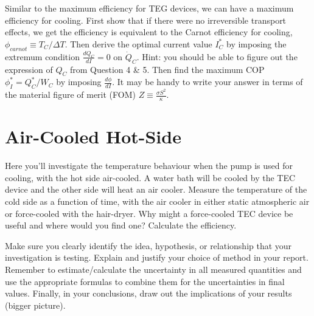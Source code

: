\documentclass[
  letterpaper,
  DIV=11,
  numbers=noendperiod]{scrreprt}
\begin{document}
\begin{tcolorbox}[enhanced jigsaw, toprule=.15mm, coltitle=black, bottomrule=.15mm, colbacktitle=quarto-callout-tip-color!10!white, opacitybacktitle=0.6, titlerule=0mm, colframe=quarto-callout-tip-color-frame, title=\textcolor{quarto-callout-tip-color}{\faLightbulb}\hspace{0.5em}{Question 8 (Advanced)}, leftrule=.75mm, bottomtitle=1mm, breakable, opacityback=0, arc=.35mm, left=2mm, colback=white, rightrule=.15mm, toptitle=1mm]

Similar to the maximum efficiency for TEG devices, we can have a maximum
efficiency for cooling. First show that if there were no irreversible
transport effects, we get the efficiency is equivalent to the Carnot
efficiency for cooling, \(\phi_{carnot} \equiv T_{C}/\Delta T\). Then
derive the optimal current value \(I_{C}^{*}\) by imposing the extremum
condition \(\frac{dQ_{C}}{dI} = 0\) on \(\dot{Q}_{C}\). Hint: you should
be able to figure out the expression of \(Q_{C}\) from Question 4 \& 5.
Then find the maximum COP \(\phi_{I}^{*} = Q_{C}^{*}/W_{C}\) by imposing
\(\frac{d\phi}{dI}\). It may be handy to write your answer in terms of
the material figure of merit (FOM)
\(Z \equiv \frac{\sigma S^{2}}{\kappa}\).

\end{tcolorbox}

\hypertarget{air-cooled-hot-side}{%
\section{Air-Cooled Hot-Side}\label{air-cooled-hot-side}}

Here you'll investigate the temperature behaviour when the pump is used
for cooling, with the hot side air-cooled. A water bath will be cooled
by the TEC device and the other side will heat an air cooler. Measure
the temperature of the cold side as a function of time, with the air
cooler in either static atmospheric air or force-cooled with the
hair-dryer. Why might a force-cooled TEC device be useful and where
would you find one? Calculate the efficiency.

Make sure you clearly identify the idea, hypothesis, or relationship
that your investigation is testing. Explain and justify your choice of
method in your report. Remember to estimate/calculate the uncertainty in
all measured quantities and use the appropriate formulas to combine them
for the uncertainties in final values. Finally, in your conclusions,
draw out the implications of your results (bigger picture).
\end{document}
